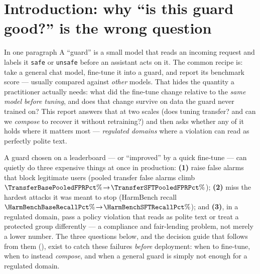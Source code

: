 \documentclass[11pt]{article}
\newcommand{\code}[1]{\texttt{\small #1}}
\begin{document}
\clearpage
\tableofcontents

\section{Introduction: why ``is this guard good?'' is the wrong question}
\label{sec:intro}

\begin{background}{In one paragraph}
A ``guard'' is a small model that reads an incoming request and labels it \code{safe} or \code{unsafe}
before an assistant acts on it. The common recipe is: take a general chat model, fine-tune it into a
guard, and report its benchmark score --- usually compared against \emph{other} models. That hides the
quantity a practitioner actually needs: what did the fine-tune change relative to the \emph{same model
before tuning}, and does that change survive on data the guard never trained on? This report answers
that at two scales (does tuning transfer? and can we \emph{compose} to recover it without retraining?) and
then asks whether any of it holds where it matters most --- \emph{regulated domains} where a violation can
read as perfectly polite text.
\end{background}

A guard chosen on a leaderboard --- or ``improved'' by a quick fine-tune --- can quietly do three expensive
things at once in production: \textbf{(1)} raise false alarms that block legitimate users (pooled transfer
false alarms climb $\TransferBasePooledFPRPct\%\!\to\!\TransferSFTPooledFPRPct\%$); \textbf{(2)} miss the hardest
attacks it was meant to stop (HarmBench recall $\HarmBenchBaseRecallPct\%\!\to\!\HarmBenchSFTRecallPct\%$);
and \textbf{(3)}, in a regulated domain, pass a policy violation that reads as polite text or treat a
protected group differently --- a compliance and fair-lending problem, not merely a lower number. The three
questions below, and the decision guide that follows from them (), exist to catch
these failures \emph{before} deployment: when to fine-tune, when to instead \emph{compose}, and when a
general guard is simply not enough for a regulated domain.
\end{document}

